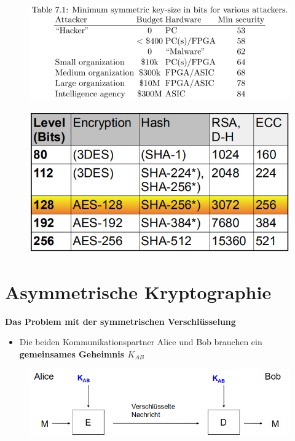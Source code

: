 \documentclass[openany]{book}
\begin{document}
\begin{figure}[h!]
    \centering
    \includegraphics[width=\linewidth]{Pics/SecurityLevel1.PNG}
\end{figure} 

\newpage

\begin{figure}[h!]
    \centering
    \includegraphics[width=\linewidth]{Pics/SecurityLevel2.PNG}
\end{figure} 

\newpage

\section{Asymmetrische Kryptographie}

\textbf{Das Problem mit der symmetrischen Verschlüsselung}

\begin{itemize}
    \item Die beiden Kommunikationspartner Alice und Bob brauchen ein \textbf{gemeinsames Geheimnis $K_{AB}$}
\end{itemize}

\begin{figure}[h!]
    \centering
    \includegraphics[width=\linewidth]{Pics/SymmetricEncryption.PNG}
\end{figure} 
\end{document}
